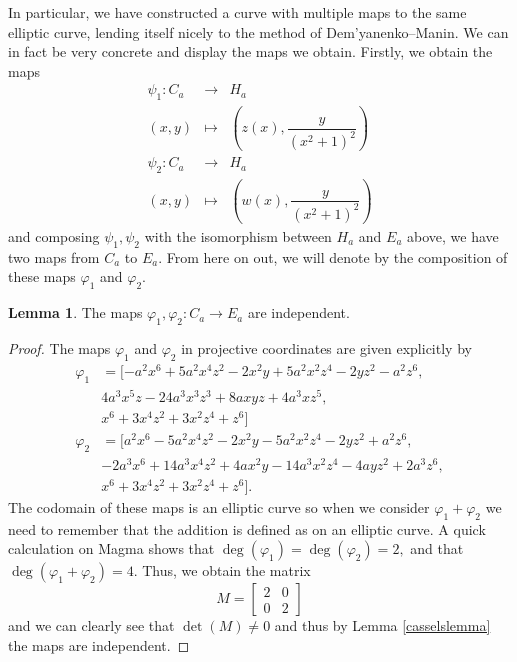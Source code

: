 \documentclass{article}
\theoremstyle{definition}
\newtheorem{lemma}[theorem]{Lemma}
\begin{document}
In particular, we have constructed a curve with multiple maps to the same elliptic curve, lending itself nicely to the method of Dem'yanenko--Manin. We can in fact be very concrete and display the maps we obtain. Firstly, we obtain the maps 
\begin{eqnarray*}
    \psi_1 \colon C_a &\to& H_a \\
    (x,y) &\mapsto& \left(z(x), \dfrac{y}{(x^2+1)^2}\right) \\
    \psi_2 \colon C_a &\to& H_a \\
    (x,y) &\mapsto& \left(w(x), \dfrac{y}{(x^2+1)^2}\right)
\end{eqnarray*}
and composing $\psi_1, \psi_2$ with the isomorphism between $H_a$ and $E_a$ above, we have two maps from $C_a$ to $E_a$. From here on out, we will denote by the composition of these maps $\varphi_1$ and $\varphi_2$. 
\begin{lemma}
    The maps $\varphi_1, \varphi_2 \colon C_a \to E_a$ are independent.
\end{lemma}
\begin{proof}
    The maps $\varphi_1$ and $\varphi_2$ in projective coordinates are given explicitly by
\begin{align*}
    \varphi_1 &= [-a^2x^6 + 5a^2 x^4z^2 - 2x^2y + 5a^2x^2 z^4 - 2yz^2 - a^2 z^6, \\
    &4a^3x^5z - 24a^3 x^3z^3 +8axyz + 4a^3xz^5, \\
    &x^6 + 3x^4z^2 + 3x^2z^4 + z^6] \\
    \varphi_2 &= [a^2x^6 - 5a^2 x^4z^2 - 2x^2y - 5a^2x^2 z^4 - 2yz^2 + a^2 z^6, \\
    &-2a^3x^6 + 14a^3 x^4z^2 + 4ax^2y - 14a^3 x^2z^4 - 4ayz^2 + 2a^3z^6, \\
    &x^6 + 3x^4z^2 + 3x^2z^4 + z^6].
\end{align*}
The codomain of these maps is an elliptic curve so when we consider $\varphi_1 + \varphi_2$ we need to remember that the addition is defined as on an elliptic curve. A quick calculation on Magma shows that $\deg(\varphi_1) = \deg(\varphi_2) = 2,$ and that $\deg(\varphi_1 + \varphi_2) = 4$. Thus, we obtain the matrix
$$M = \begin{bmatrix}
    2 & 0 \\ 0 & 2
\end{bmatrix}$$
and we can clearly see that $\det(M) \neq 0$ and thus by Lemma \ref{casselslemma} the maps are independent.
\end{proof}
\end{document}
